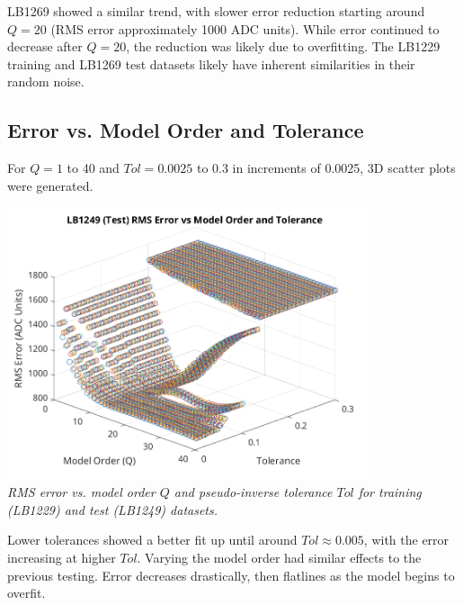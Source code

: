 \documentclass[12pt]{article}
\begin{document}
LB1269 showed a similar trend, with slower error reduction starting around $Q = 20$ (RMS error approximately 1000 ADC units). While error continued to decrease after $Q = 20$, the reduction was likely due to overfitting. The LB1229 training and LB1269 test datasets likely have inherent similarities in their random noise.

\newpage
\subsection*{Error vs. Model Order and Tolerance}
For $Q = 1$ to 40 and $Tol = 0.0025$ to 0.3 in increments of 0.0025, 3D scatter plots were generated. 

\begin{center}
     \includegraphics[width=0.8\textwidth]{plots/lab1_tol_test_49.png} \\
     \textit{RMS error vs. model order $Q$ and pseudo-inverse tolerance $Tol$ for training (LB1229) and test (LB1249) datasets.}
\end{center}
Lower tolerances showed a better fit up until around $Tol \approx 0.005$, with the error increasing at higher $Tol$. Varying the model order had similar effects to the previous testing. Error decreases drastically, then flatlines as the model begins to overfit.
\end{document}
